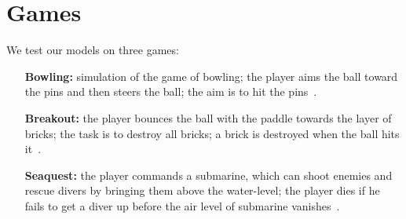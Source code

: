 \section{Games}
We test our models on three games:
\begin{itemize}[itemindent=28pt]
  \item[\textbf{Bowling:}]{simulation of the game of bowling; the player aims the ball toward the pins and then steers the ball; the aim is to hit the pins~\cite{bowling,bowling_man}.}
  \item[\textbf{Breakout:}]{the player bounces the ball with the paddle towards the layer of bricks; the task is to destroy all bricks; a brick is destroyed when the ball hits it~\cite{breakout,breakout_man}.}
  \item[\textbf{Seaquest:}]{the player commands a submarine, which can shoot enemies and rescue divers by bringing them above the water-level; the player dies if he fails to get a diver up before the air level of submarine vanishes~\cite{seaquest,seaquest_man}.}
\end{itemize}
